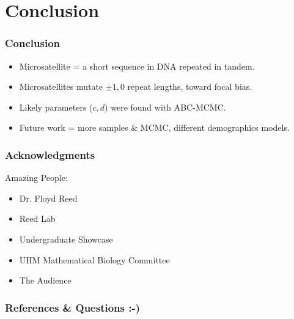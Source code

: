 \documentclass[11pt]{beamer}
\begin{document}
    \section{Conclusion}\label{sec:c}
    \begin{frame}
        \frametitle{Conclusion}
        \begin{itemize}
            \item Microsatellite = a short sequence in DNA repeated in tandem.\medskip
            \item Microsatellites mutate $\pm 1,0$ repeat lengths, toward focal bias.\medskip
            \item Likely parameters ($c, d$) were found with ABC-MCMC.\medskip
            \item Future work = more samples \& MCMC, different demographics models.
        \end{itemize}

    \end{frame}

    \begin{frame}
        \frametitle{Acknowledgments}
        \begin{block}{Amazing People:}
            \begin{itemize}
                \item Dr. Floyd Reed \smallskip
                \item Reed Lab \smallskip
                \item Undergraduate Showcase \smallskip
                \item UHM Mathematical Biology Committee \smallskip
                \item The Audience
            \end{itemize}
        \end{block}
    \end{frame}

    \begin{frame}
        \frametitle{References \& Questions :-)}
        \tiny
        
        
    \end{frame}


\end{document}
